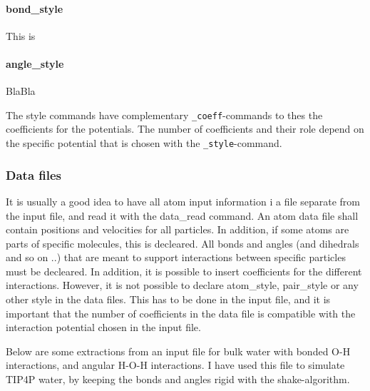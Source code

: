 \paragraph{bond\_style}
This is 

\paragraph{angle\_style}
BlaBla

The style commands have complementary {\tt \_coeff}-commands to thes the coefficients for the potentials. The number of coefficients and their role depend on the specific potential that is chosen with the {\tt \_style}-command.

\subsubsection{Data files}
It is usually a good idea to have all atom input information i a file separate from the input file, and read it with the data\_read command. An atom data file shall contain positions and velocities for all particles. In addition, if some atoms are parts of specific molecules, this is decleared. All bonds and angles (and dihedrals and so on ..) that are meant to support interactions between specific particles must be decleared. In addition, it is possible to insert coefficients for the different interactions. However, it is not possible to declare atom\_style, pair\_style or any other style in the data files. This has to be done in the input file, and it is important that the number of coefficients in the data file is compatible with the interaction potential chosen in the input file. 

Below are some extractions from an input file for bulk water with bonded O-H interactions, and angular H-O-H interactions. I have used this file to simulate TIP4P water, by keeping the bonds and angles rigid with the shake-algorithm. 

